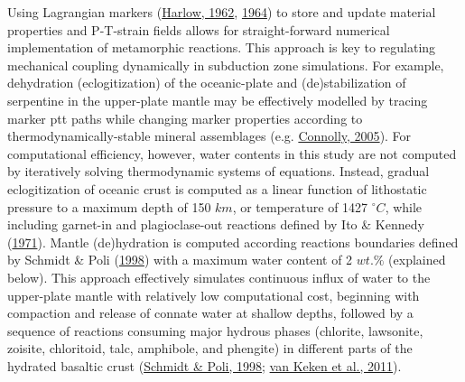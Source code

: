 Using Lagrangian markers (\protect\hyperlink{ref-harlow1962}{Harlow, 1962}, \protect\hyperlink{ref-harlow1964}{1964}) to store and update material properties and P-T-strain fields allows for straight-forward numerical implementation of metamorphic reactions. This approach is key to regulating mechanical coupling dynamically in subduction zone simulations. For example, dehydration (eclogitization) of the oceanic-plate and (de)stabilization of serpentine in the upper-plate mantle may be effectively modelled by tracing marker \gls{ptt} paths while changing marker properties according to thermodynamically-stable mineral assemblages (e.g. \protect\hyperlink{ref-connolly2005}{Connolly, 2005}). For computational efficiency, however, water contents in this study are not computed by iteratively solving thermodynamic systems of equations. Instead, gradual eclogitization of oceanic crust is computed as a linear function of lithostatic pressure to a maximum depth of 150 \(km\), or temperature of 1427 \(^\circ C\), while including garnet-in and plagioclase-out reactions defined by Ito \& Kennedy (\protect\hyperlink{ref-ito1971}{1971}). Mantle (de)hydration is computed according reactions boundaries defined by Schmidt \& Poli (\protect\hyperlink{ref-schmidt1998}{1998}) with a maximum water content of 2 \(wt.\%\) (explained below). This approach effectively simulates continuous influx of water to the upper-plate mantle with relatively low computational cost, beginning with compaction and release of connate water at shallow depths, followed by a sequence of reactions consuming major hydrous phases (chlorite, lawsonite, zoisite, chloritoid, talc, amphibole, and phengite) in different parts of the hydrated basaltic crust (\protect\hyperlink{ref-schmidt1998}{Schmidt \& Poli, 1998}; \protect\hyperlink{ref-vankeken2011}{van Keken et al., 2011}).

